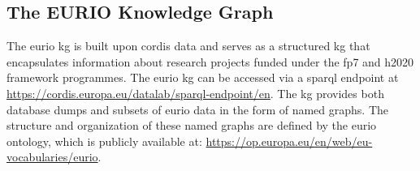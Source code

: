\subsection*{The EURIO Knowledge Graph}
The \gls{eurio} \acrlong{kg} \cite{CORDIS_EURIO_2022} is built upon \gls{cordis} data and serves as a structured \gls{kg} that encapsulates information about research projects funded under the \gls{fp7} and \gls{h2020} framework programmes.
The \gls{eurio} \gls{kg} can be accessed via a \gls{sparql} endpoint at \url{https://cordis.europa.eu/datalab/sparql-endpoint/en}.
The \gls{kg} provides both database dumps and subsets of \gls{eurio} data in the form of named graphs.
The structure and organization of these named graphs are defined by the \gls{eurio} ontology, which is publicly available at: \url{https://op.europa.eu/en/web/eu-vocabularies/eurio}.

